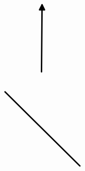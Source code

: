 \documentclass[10pt]{article}
\theoremstyle{plain}
\theoremstyle{remark}
\begin{document}
\[\begin{pgfpicture}
\begin{pgfscope}
\pgfpathlineto{\pgfqpoint{1.403986in}{1.812564in}}%
\pgfpathlineto{\pgfqpoint{1.314883in}{1.767169in}}%
\pgfpathclose%
\pgfusepath{stroke,fill}%
\end{pgfscope}%
\begin{pgfscope}%
\pgfpathrectangle{\pgfqpoint{0.224216in}{0.187957in}}{\pgfqpoint{3.754528in}{5.640000in}} %
\pgfusepath{clip}%
\pgfsetroundcap%
\pgfsetroundjoin%
\pgfsetlinewidth{2.007500pt}%
\definecolor{currentstroke}{rgb}{0.000000,0.000000,0.000000}%
\pgfsetstrokecolor{currentstroke}%
\pgfsetdash{}{0pt}%
\pgfpathmoveto{\pgfqpoint{1.201098in}{2.325742in}}%
\pgfpathquadraticcurveto{\pgfqpoint{1.206517in}{3.007954in}}{\pgfqpoint{1.211690in}{3.659111in}}%
\pgfusepath{stroke}%
\end{pgfscope}%
\begin{pgfscope}%
\pgfpathrectangle{\pgfqpoint{0.224216in}{0.187957in}}{\pgfqpoint{3.754528in}{5.640000in}} %
\pgfusepath{clip}%
\pgfsetroundcap%
\pgfsetroundjoin%
\definecolor{currentfill}{rgb}{0.000000,0.000000,0.000000}%
\pgfsetfillcolor{currentfill}%
\pgfsetlinewidth{2.007500pt}%
\definecolor{currentstroke}{rgb}{0.000000,0.000000,0.000000}%
\pgfsetstrokecolor{currentstroke}%
\pgfsetdash{}{0pt}%
\pgfpathmoveto{\pgfqpoint{1.160897in}{3.559512in}}%
\pgfpathlineto{\pgfqpoint{1.211690in}{3.659111in}}%
\pgfpathlineto{\pgfqpoint{1.260894in}{3.558717in}}%
\pgfpathlineto{\pgfqpoint{1.160897in}{3.559512in}}%
\pgfpathclose%
\pgfusepath{stroke,fill}%
\end{pgfscope}%
\begin{pgfscope}%
\pgfpathrectangle{\pgfqpoint{0.224216in}{0.187957in}}{\pgfqpoint{3.754528in}{5.640000in}} %
\pgfusepath{clip}%
\pgfsetroundcap%
\pgfsetroundjoin%
\pgfsetlinewidth{2.007500pt}%
\definecolor{currentstroke}{rgb}{0.000000,0.000000,0.000000}%
\pgfsetstrokecolor{currentstroke}%
\pgfsetdash{}{0pt}%
\pgfpathmoveto{\pgfqpoint{1.962859in}{0.452457in}}%
\pgfpathquadraticcurveto{\pgfqpoint{1.208351in}{1.200270in}}{\pgfqpoint{0.475900in}{1.926222in}}%
\pgfusepath{stroke}%
\end{pgfscope}%
\begin{pgfscope}%
\pgfpathrectangle{\pgfqpoint{0.224216in}{0.187957in}}{\pgfqpoint{3.754528in}{5.640000in}} %
\pgfusepath{clip}%
\pgfsetroundcap%
\pgfsetroundjoin%
\definecolor{currentfill}{rgb}{0.000000,0.000000,0.000000}%
\pgfsetfillcolor{currentfill}%
\pgfsetlinewidth{2.007500pt}%
\definecolor{currentstroke}{rgb}{0.000000,0.000000,0.000000}%
\pgfsetstrokecolor{currentstroke}%
\pgfsetdash{}{0pt}%
\pgfpathmoveto{\pgfqpoint{0.511728in}{1.820314in}}%
\pgfpathlineto{\pgfqpoint{0.475900in}{1.926222in}}%

\end{pgfscope}
\end{pgfpicture}\]
\end{document}
